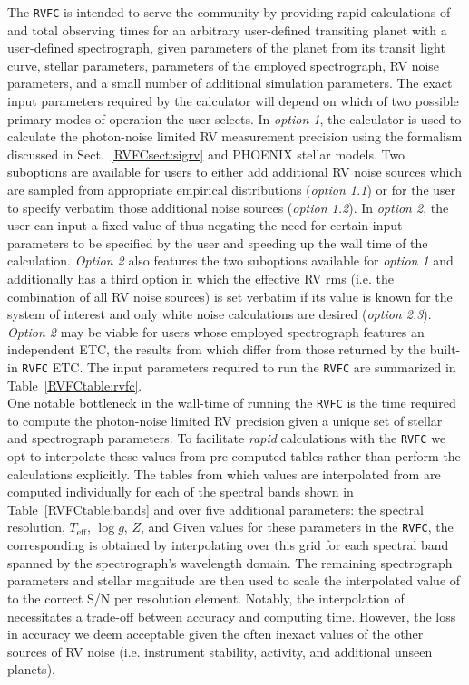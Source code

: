 The \texttt{RVFC} is intended to serve the community by providing rapid calculations of
\nrv{} and total observing times for an arbitrary user-defined transiting planet with a user-defined
spectrograph, given parameters of the planet from its
transit light curve, stellar parameters, parameters of the employed spectrograph, RV noise
parameters, and a small number of additional simulation parameters.
The exact input parameters required by the calculator will depend on which of two
possible primary modes-of-operation the user selects. In \emph{option 1}, the calculator is used to
calculate the photon-noise limited RV measurement precision \sigRV{} using the formalism discussed in
Sect.~\ref{RVFCsect:sigrv} and PHOENIX stellar models. Two suboptions are available for
users to either add additional RV noise sources which are sampled from appropriate empirical distributions
(\emph{option 1.1}) or for the user to specify verbatim those additional noise sources
(\emph{option 1.2}). In \emph{option 2}, the user can input a fixed value of \sigRV{} thus
negating the need for certain input parameters to be specified by the user and
speeding up the wall time of the calculation. \emph{Option 2} also features the two suboptions available
for \emph{option 1} and additionally has a third option in which the effective RV rms 
(i.e. the combination of all RV noise sources) is set verbatim if its value is known for the system of
interest and only white noise calculations are desired (\emph{option 2.3}).
\emph{Option 2} may be viable for users whose employed
spectrograph features an independent ETC, the results from which differ from those returned by
the built-in \texttt{RVFC} ETC. 
The input parameters required to run the \texttt{RVFC} are summarized in Table~\ref{RVFCtable:rvfc}. \\



One notable bottleneck in the wall-time of running the \texttt{RVFC} is the time required to compute
the photon-noise limited RV precision given a unique set of stellar and spectrograph parameters. To
facilitate \emph{rapid} calculations  with the \texttt{RVFC} we opt to interpolate these values from
pre-computed tables rather than perform the calculations explicitly. The tables from which \sigRV{}
values are interpolated from are computed individually
for each of the spectral bands shown in Table~\ref{RVFCtable:bands} and
over five additional parameters: the spectral resolution, $T_{\text{eff}}$, $\log{g}$, $Z$, and 
Given values for these parameters in the \texttt{RVFC}, the corresponding \sigRV{} is obtained by
interpolating over this grid for each spectral band spanned by the spectrograph's wavelength domain. 
The remaining spectrograph parameters and stellar magnitude are then used to scale the interpolated
value of \sigRV{} to the correct S/N per resolution element. Notably, 
the interpolation of \sigRV{} necessitates a trade-off between accuracy and computing time. However,
the loss in accuracy we deem acceptable given the often inexact values of the other sources of RV
noise (i.e. instrument stability, activity, and additional unseen planets). \\

